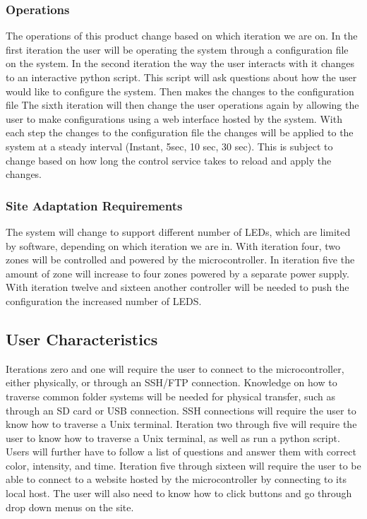 \documentclass[onecolumn, draftclsnofoot,10pt, compsoc]{IEEEtran}
\begin{document}
			\subsubsection*{Operations}
				The operations of this product change based on which iteration we are on. In the first iteration the user will be operating the system through a configuration file on the system. In the second iteration
				the way the user interacts with it changes to an interactive python script. This script will ask questions about how the user would like to configure the system. Then makes the changes to the configuration file
				The sixth iteration will then change the user operations again by allowing the user to make configurations using a web interface hosted by the system. With each step the changes to the configuration file the
				changes will be applied to the system at a steady interval (Instant, 5sec, 10 sec, 30 sec). This is subject to change based on how long the control service takes to reload and apply the changes.
			\subsubsection*{Site Adaptation Requirements}
				The system will change to support different number of LEDs, which are limited by software, depending on which iteration we are in. With iteration four, two zones will be controlled and powered by the microcontroller.
				In iteration five the amount of zone will increase to four zones powered by a separate power supply. With iteration twelve and sixteen another controller will be needed to push the configuration the increased number
				of LEDS.



		\subsection*{User Characteristics}
		Iterations zero and one will require the user to connect to the microcontroller, either physically, or through an SSH/FTP connection. Knowledge on how to traverse common folder systems will be needed for physical transfer, such as
		through an SD card or USB connection. SSH connections will require the user to know how to traverse a Unix terminal.
		Iteration two through five will require the user to know how to traverse a Unix terminal, as well as run a python script. Users will further have to follow a list of questions and answer them with correct color, intensity, and time.
		Iteration five through sixteen will require the user to be able to connect to a website hosted by the microcontroller by connecting to its local host. The user will also need to know how to click buttons and go through drop down menus on the site.
\end{document}

